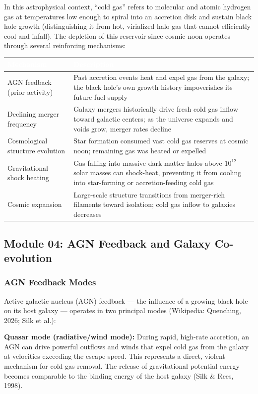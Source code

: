 \documentclass[11pt,letterpaper]{article}
\newcommand{\tableheader}[1]{\textbf{\sffamily\textcolor{white}{#1}}}
\begin{document}
In this astrophysical context, ``cold gas'' refers to molecular and atomic hydrogen gas at temperatures low enough to spiral into an accretion disk and sustain black hole growth (distinguishing it from hot, virialized halo gas that cannot efficiently cool and infall). The depletion of this reservoir since cosmic noon operates through several reinforcing mechanisms:

\begin{center}
\begin{tabularx}{\textwidth}{L{4cm}X}
\toprule
{}
\tableheader{Mechanism} & \tableheader{Description} \\
\midrule
AGN feedback (prior activity) & Past accretion events heat and expel gas from the galaxy; the black hole's own growth history impoverishes its future fuel supply \\
Declining merger frequency & Galaxy mergers historically drive fresh cold gas inflow toward galactic centers; as the universe expands and voids grow, merger rates decline \\
Cosmological structure evolution & Star formation consumed vast cold gas reserves at cosmic noon; remaining gas was heated or expelled \\
Gravitational shock heating & Gas falling into massive dark matter halos above $10^{12}$ solar masses can shock-heat, preventing it from cooling into star-forming or accretion-feeding cold gas \\
Cosmic expansion & Large-scale structure transitions from merger-rich filaments toward isolation; cold gas inflow to galaxies decreases \\
\bottomrule
\end{tabularx}
\end{center}

\subsection{Module 04: AGN Feedback and Galaxy Co-evolution}

\subsubsection{AGN Feedback Modes}

Active galactic nucleus (AGN) feedback --- the influence of a growing black hole on its host galaxy --- operates in two principal modes (Wikipedia: Quenching, 2026; Silk et al.):

\textbf{Quasar mode (radiative/wind mode):} During rapid, high-rate accretion, an AGN can drive powerful outflows and winds that expel cold gas from the galaxy at velocities exceeding the escape speed. This represents a direct, violent mechanism for cold gas removal. The release of gravitational potential energy becomes comparable to the binding energy of the host galaxy (Silk \& Rees, 1998).
\end{document}
